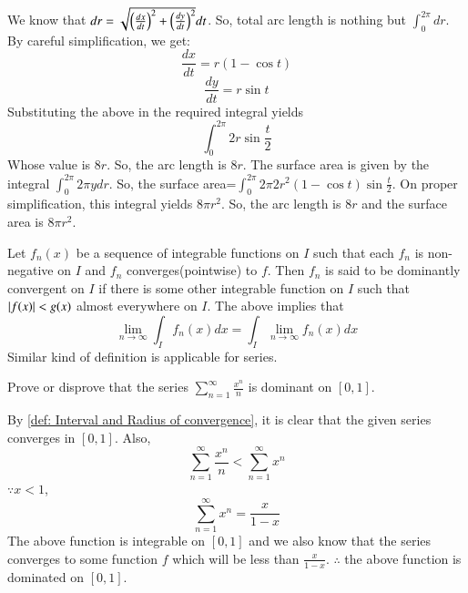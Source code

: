 \documentclass[journal,12pt,twocolumn]{IEEEtran}
\begin{document}
We know that $dr=\sqrt{\left(\frac{dx}{dt}\right)^2+\left(\frac{dy}{dt}\right)^2} dt$. So, total arc length is nothing but $\int_{0}^{2\pi} dr$. By careful simplification, we get:
\begin{equation}
\frac{dx}{dt}=r(1-\cos t)	
\end{equation}
\begin{equation}
\frac{dy}{dt}=r\sin t
\end{equation}
Substituting the above in the required integral yields
\begin{equation}
\int_{0}^{2\pi}2r \sin \frac{t}{2}
\end{equation}
Whose value is $8r$. So, the arc length is $8r$.
The surface area is given by the integral $\int_{0}^{2\pi} 2\pi y dr$. So, the surface area=$\int_{0}^{2\pi} 2   \pi 2r^2(1-\cos t)\sin \frac{t}{2}$. On proper simplification, this integral yields $8 \pi r^2$.
So, the arc length is $8r$ and the surface area is $8 \pi r^2$. 
\begin{proposition}
\label{Lebesegue's Dominated convergence theorem}
Let $f_n(x)$ be a sequence of integrable functions on $I$ such that each $f_n$ is non-negative on $I$ and $f_n$ converges(pointwise) to $f$. Then $f_n$ is said to be dominantly convergent on $I$ if there is some other integrable function on $I$ such that $\left\vert f(x)\right\vert<g(x)$ almost everywhere on $I$.
The above implies that 
\begin{equation}
\lim_{n \to \infty}\int_{I}f_n(x) dx=\int_{I}\lim_{n \to \infty}f_n(x) dx
\end{equation}
Similar kind of definition is applicable for series.
\end{proposition}
\begin{problem}
Prove or disprove that the series $\sum_{n=1}^{\infty}\frac{x^n}{n}$ is dominant on $[0,1]$.
\end{problem}
\solution
By \ref{def: Interval and Radius of convergence}, it is clear that the given series converges in $[0,1]$. Also,
\begin{equation}
\sum_{n=1}^{\infty}\frac{x^n}{n} < \sum_{n=1}^{\infty} x^n
\end{equation}
$\because x<1$,  
\begin{equation}
\sum_{n=1}^{\infty} x^n = \frac{x}{1-x}
\end{equation}
The above function is integrable on $[0,1]$ and we also know that the series converges to some function $f$ which will be less than $\frac{x}{1-x}$.
$\therefore$ the above function is dominated on $[0,1]$.
\end{document}
